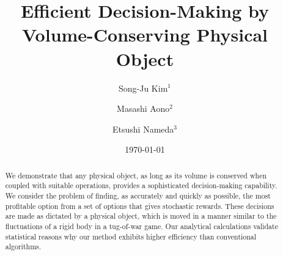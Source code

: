 \documentclass[twocolumn,showpacs,preprintnumbers,amsmath,amssymb]{revtex4}
\begin{document}
\preprint{}

\title{Efficient Decision-Making by Volume-Conserving Physical Object}

\author{Song-Ju Kim$^{1}$}

\author{Masashi Aono$^{2}$}

\author{Etsushi Nameda$^{3}$}

%

%


%


\date{\today}%

\begin{abstract}
We demonstrate that any physical object, as long as its volume is conserved when coupled with suitable operations, provides a sophisticated decision-making capability.
We consider the problem of finding, as accurately and quickly as possible, the most profitable option from a set of options that gives stochastic rewards.
These decisions are made as dictated by a physical object, which is moved in a manner similar to the fluctuations of a rigid body in a tug-of-war game. 
Our analytical calculations validate statistical reasons why our method exhibits higher efficiency than conventional algorithms.
\end{abstract}

                             
\maketitle
\end{document}

